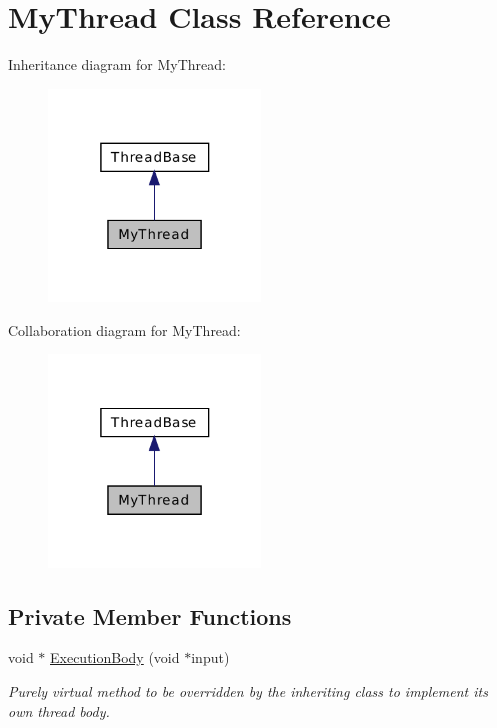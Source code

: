 \hypertarget{class_my_thread}{\section{My\-Thread Class Reference}
\label{class_my_thread}
}


Inheritance diagram for My\-Thread\-:
\nopagebreak
\begin{figure}[H]
\begin{center}
\leavevmode
\includegraphics[width=160pt]{class_my_thread__inherit__graph}
\end{center}
\end{figure}


Collaboration diagram for My\-Thread\-:
\nopagebreak
\begin{figure}[H]
\begin{center}
\leavevmode
\includegraphics[width=160pt]{class_my_thread__coll__graph}
\end{center}
\end{figure}
\subsection*{Private Member Functions}
\begin{DoxyCompactItemize}
\item 
void $\ast$ \hyperlink{class_my_thread_a481693b2ddb2f41e0181d1f9b7de0a21}{Execution\-Body} (void $\ast$input)
\begin{DoxyCompactList}\small\item\em Purely virtual method to be overridden by the inheriting class to implement its own thread body. \end{DoxyCompactList}\end{DoxyCompactItemize}
